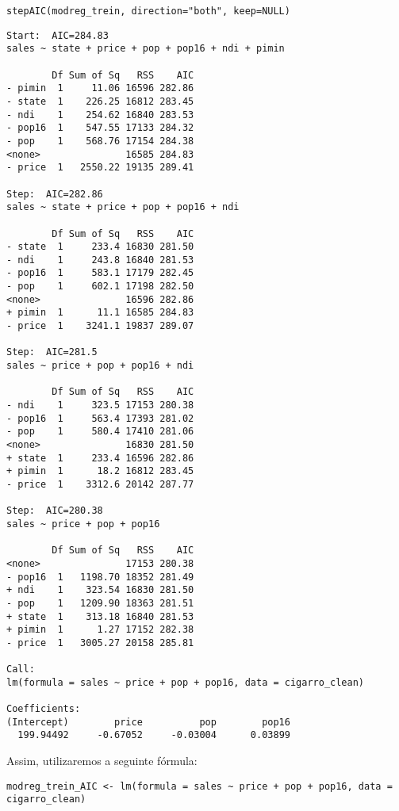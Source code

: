 \documentclass[11pt]{article}
\begin{document}
\begin{enumerate}
\begin{verbatim}
stepAIC(modreg_trein, direction="both", keep=NULL)
\end{verbatim}

\begin{verbatim}
Start:  AIC=284.83
sales ~ state + price + pop + pop16 + ndi + pimin

        Df Sum of Sq   RSS    AIC
- pimin  1     11.06 16596 282.86
- state  1    226.25 16812 283.45
- ndi    1    254.62 16840 283.53
- pop16  1    547.55 17133 284.32
- pop    1    568.76 17154 284.38
<none>               16585 284.83
- price  1   2550.22 19135 289.41

Step:  AIC=282.86
sales ~ state + price + pop + pop16 + ndi

        Df Sum of Sq   RSS    AIC
- state  1     233.4 16830 281.50
- ndi    1     243.8 16840 281.53
- pop16  1     583.1 17179 282.45
- pop    1     602.1 17198 282.50
<none>               16596 282.86
+ pimin  1      11.1 16585 284.83
- price  1    3241.1 19837 289.07

Step:  AIC=281.5
sales ~ price + pop + pop16 + ndi

        Df Sum of Sq   RSS    AIC
- ndi    1     323.5 17153 280.38
- pop16  1     563.4 17393 281.02
- pop    1     580.4 17410 281.06
<none>               16830 281.50
+ state  1     233.4 16596 282.86
+ pimin  1      18.2 16812 283.45
- price  1    3312.6 20142 287.77

Step:  AIC=280.38
sales ~ price + pop + pop16

        Df Sum of Sq   RSS    AIC
<none>               17153 280.38
- pop16  1   1198.70 18352 281.49
+ ndi    1    323.54 16830 281.50
- pop    1   1209.90 18363 281.51
+ state  1    313.18 16840 281.53
+ pimin  1      1.27 17152 282.38
- price  1   3005.27 20158 285.81

Call:
lm(formula = sales ~ price + pop + pop16, data = cigarro_clean)

Coefficients:
(Intercept)        price          pop        pop16  
  199.94492     -0.67052     -0.03004      0.03899  

\end{verbatim}


Assim, utilizaremos a seguinte fórmula:
\begin{verbatim}
modreg_trein_AIC <- lm(formula = sales ~ price + pop + pop16, data = cigarro_clean)
\end{verbatim}



\end{enumerate}
\end{document}
